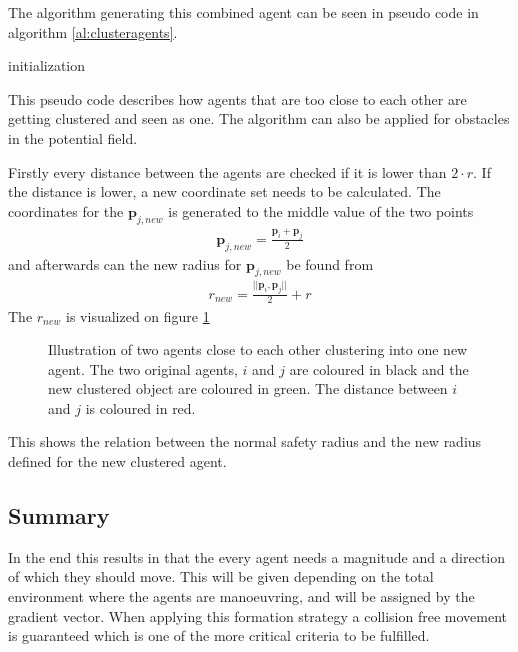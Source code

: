 The algorithm generating this combined agent can be seen in pseudo code in algorithm \ref{al:clusteragents}.
\begin{algorithm}[H]
  initialization\;
  \caption{This pseudo code describes how agents that are too close to each other are getting clustered and seen as one. The algorithm can also be applied for obstacles in the potential field.\vspace{3mm}}
  \label{al:clusteragents}
\end{algorithm}

Firstly every distance between the agents are checked if it is lower than $2 \cdot r$. If the distance is lower, a new coordinate set needs to be calculated. The coordinates for the $\mathbf{p}_{j,new}$ is generated to the middle value of the two points
\begin{align}
\mathbf{p}_{j,new} = \frac{\mathbf{p}_i + \mathbf{p}_j}{2}
\end{align}
and afterwards can the new radius for $\mathbf{p}_{j,new}$ be found from
\begin{align}
r_{new} = \frac{||\mathbf{p}_i , \mathbf{p}_j||}{2} + r
\end{align}
The $r_{new}$ is visualized on figure \ref{fig:rnew}
\begin{figure}[htbp]
\centering

\caption{Illustration of two agents close to each other clustering into one new agent. The two original agents, $i$ and $j$ are coloured in black and the new clustered object are coloured in green. The distance between $i$ and $j$ is coloured in red.}
\label{fig:rnew}
\end{figure}
This shows the relation between the normal safety radius and the new radius defined for the new clustered agent.

\subsection{Summary}
In the end this results in that the every agent needs a magnitude and
a direction of which they should move. This will be given depending on
the total environment where the agents are manoeuvring, and will be assigned by the gradient vector. When applying
this formation strategy a collision free movement is guaranteed which
is one of the more critical criteria to be fulfilled. 

